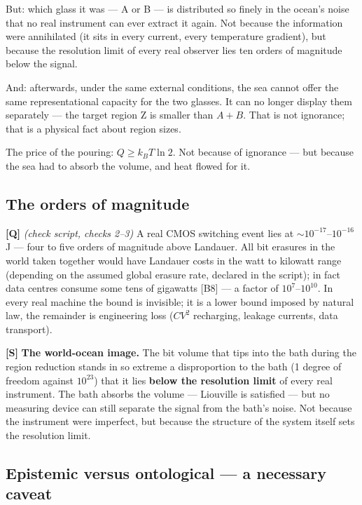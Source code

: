 But: which glass it was --- A or B --- is distributed so finely in the ocean's
noise that no real instrument can ever extract it again. Not because the
information were annihilated (it sits in every current, every temperature
gradient), but because the resolution limit of every real observer lies ten orders
of magnitude below the signal.

And: afterwards, under the same external conditions, the sea cannot offer the same
representational capacity for the two glasses. It can no longer display them
separately --- the target region Z is smaller than $A+B$. That is not ignorance;
that is a physical fact about region sizes.

The price of the pouring: $Q \ge k_B T \ln 2$. Not because of ignorance --- but
because the sea had to absorb the volume, and heat flowed for it.

\subsection{The orders of magnitude}

\textbf{[Q]} \emph{(check script, checks 2--3)} A real CMOS switching event lies at
${\sim}10^{-17}$--$10^{-16}$\,J --- four to five orders of magnitude above
Landauer. All bit erasures in the world taken together would have Landauer costs
in the watt to kilowatt range (depending on the assumed global erasure rate,
declared in the script); in fact data centres consume some tens of gigawatts [B8]
--- a factor of $10^{7}$--$10^{10}$. In every real machine the bound is invisible;
it is a lower bound imposed by natural law, the remainder is engineering loss
($CV^2$ recharging, leakage currents, data transport).

\textbf{[S]} \textbf{The world-ocean image.} The bit volume that tips into the bath during
the region reduction stands in so extreme a disproportion to the bath (1 degree of
freedom against $10^{23}$) that it lies \textbf{below the resolution limit} of
every real instrument. The bath absorbs the volume --- Liouville is satisfied ---
but no measuring device can still separate the signal from the bath's noise. Not
because the instrument were imperfect, but because the structure of the system
itself sets the resolution limit.

\subsection{Epistemic versus ontological --- a necessary caveat}

